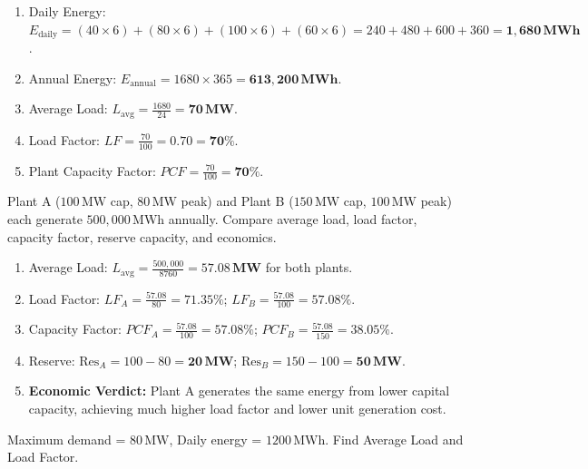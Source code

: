\documentclass[11pt,a4paper]{article}
\newenvironment{Problem}[1][Numerical Problem]{\begin{tcolorbox}[problembox, title=#1]}{\end{tcolorbox}}
\newenvironment{Solution}[1][Step-by-Step Solution]{\begin{tcolorbox}[solbox, title=#1]}{\end{tcolorbox}}
\begin{document}
\begin{Solution}
\begin{enumerate}
  \item Daily Energy: $E_{\text{daily}} = (40\times 6) + (80\times 6) + (100\times 6) + (60\times 6) = 240 + 480 + 600 + 360 = \mathbf{1,680\,\text{MWh}}$.
  \item Annual Energy: $E_{\text{annual}} = 1680 \times 365 = \mathbf{613,200\,\text{MWh}}$.
  \item Average Load: $L_{\text{avg}} = \frac{1680}{24} = \mathbf{70\,\text{MW}}$.
  \item Load Factor: $LF = \frac{70}{100} = \mathbf{0.70} = \mathbf{70\%}$.
  \item Plant Capacity Factor: $PCF = \frac{70}{100} = \mathbf{70\%}$.
\end{enumerate}
\end{Solution}

\begin{Problem}[Problem 3: Comparative Economic Evaluation of Two Power Stations]
Plant A ($100\,\text{MW}$ cap, $80\,\text{MW}$ peak) and Plant B ($150\,\text{MW}$ cap, $100\,\text{MW}$ peak) each generate $500,000\,\text{MWh}$ annually. Compare average load, load factor, capacity factor, reserve capacity, and economics.
\end{Problem}

\begin{Solution}
\begin{enumerate}
  \item Average Load: $L_{\text{avg}} = \frac{500,000}{8760} = \mathbf{57.08\,\text{MW}}$ for both plants.
  \item Load Factor: $LF_A = \frac{57.08}{80} = \mathbf{71.35\%}$; $LF_B = \frac{57.08}{100} = \mathbf{57.08\%}$.
  \item Capacity Factor: $PCF_A = \frac{57.08}{100} = \mathbf{57.08\%}$; $PCF_B = \frac{57.08}{150} = \mathbf{38.05\%}$.
  \item Reserve: $\text{Res}_A = 100 - 80 = \mathbf{20\,\text{MW}}$; $\text{Res}_B = 150 - 100 = \mathbf{50\,\text{MW}}$.
  \item \textbf{Economic Verdict:} Plant A generates the same energy from lower capital capacity, achieving much higher load factor and lower unit generation cost.
\end{enumerate}
\end{Solution}

\begin{Problem}[Problem 4: Load Factor Calculation]
Maximum demand = $80\,\text{MW}$, Daily energy = $1200\,\text{MWh}$. Find Average Load and Load Factor.
\end{Problem}
\end{document}
